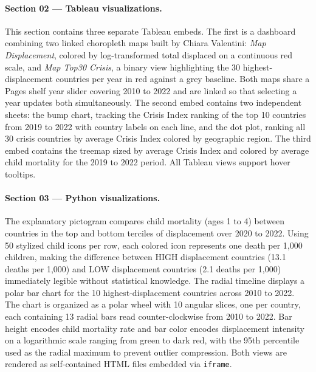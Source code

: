 \documentclass{article}
\begin{document}
\paragraph{Section 02 --- Tableau visualizations.}
This section contains three separate Tableau embeds. The first is a dashboard combining two linked choropleth maps built by Chiara Valentini: \textit{Map Displacement}, colored by log-transformed total displaced on a continuous red scale, and \textit{Map Top30 Crisis}, a binary view highlighting the 30 highest-displacement countries per year in red against a grey baseline. Both maps share a Pages shelf year slider covering 2010 to 2022 and are linked so that selecting a year updates both simultaneously. The second embed contains two independent sheets: the bump chart, tracking the Crisis Index ranking of the top 10 countries from 2019 to 2022 with country labels on each line, and the dot plot, ranking all 30 crisis countries by average Crisis Index colored by geographic region. The third embed contains the treemap sized by average Crisis Index and colored by average child mortality for the 2019 to 2022 period. All Tableau views support hover tooltips.

\paragraph{Section 03 --- Python visualizations.}
The explanatory pictogram compares child mortality (ages 1 to 4) between countries in the top and bottom terciles of displacement over 2020 to 2022. Using 50 stylized child icons per row, each colored icon represents one death per 1{,}000 children, making the difference between HIGH displacement countries (13.1 deaths per 1{,}000) and LOW displacement countries (2.1 deaths per 1{,}000) immediately legible without statistical knowledge. The radial timeline displays a polar bar chart for the 10 highest-displacement countries across 2010 to 2022. The chart is organized as a polar wheel with 10 angular slices, one per country, each containing 13 radial bars read counter-clockwise from 2010 to 2022. Bar height encodes child mortality rate and bar color encodes displacement intensity on a logarithmic scale ranging from green to dark red, with the 95th percentile used as the radial maximum to prevent outlier compression. Both views are rendered as self-contained HTML files embedded via \texttt{iframe}.
\end{document}
